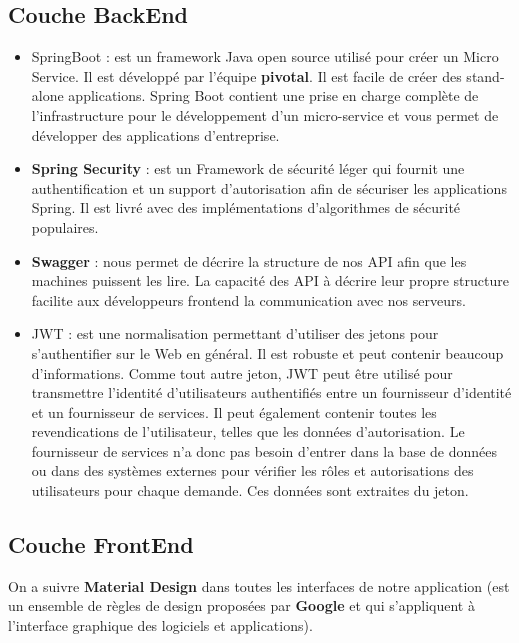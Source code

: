 \subsection{Couche BackEnd}
\begin{itemize}

\item \textcolor{spring}{SpringBoot} : est un framework Java open source utilis\'e pour cr\'eer un Micro Service. Il est d\'evelopp\'e par l'\'equipe \textbf{pivotal}. Il est facile de cr\'eer des stand-alone applications. Spring Boot contient une prise en charge compl\`ete de l'infrastructure pour le d\'eveloppement d'un micro-service et vous permet de d\'evelopper des applications d'entreprise.

\item \textbf{Spring Security} : est un Framework de s\'ecurit\'e l\'eger qui fournit une authentification et un support d'autorisation afin de s\'ecuriser les applications Spring. Il est livr\'e avec des impl\'ementations d'algorithmes de s\'ecurit\'e populaires.

\item \textbf{Swagger} : nous permet de d\'ecrire la structure de nos API afin que les machines puissent les lire. La capacit\'e des API \`a d\'ecrire leur propre structure facilite aux d\'eveloppeurs frontend la communication avec nos serveurs.

\item \gls{JWT} : est une normalisation permettant d'utiliser des jetons pour s'authentifier sur le Web en g\'en\'eral. Il est robuste et peut contenir beaucoup d'informations. Comme tout autre jeton, JWT peut \^etre utilis\'e pour transmettre l'identit\'e d'utilisateurs authentifi\'es entre un fournisseur d'identit\'e et un fournisseur de services. Il peut \'egalement contenir toutes les revendications de l'utilisateur, telles que les donn\'ees d'autorisation. Le fournisseur de services n'a donc pas besoin d'entrer dans la base de donn\'ees ou dans des syst\`emes externes pour v\'erifier les r\^oles et autorisations des utilisateurs pour chaque demande. Ces donn\'ees sont extraites du jeton.

\end{itemize}

\subsection{Couche FrontEnd}

On a suivre \textbf{Material Design} dans toutes les interfaces de notre application (est un ensemble de r\`egles de design propos\'ees par \textbf{Google} et qui s'appliquent \`a l'interface graphique des logiciels et applications).

